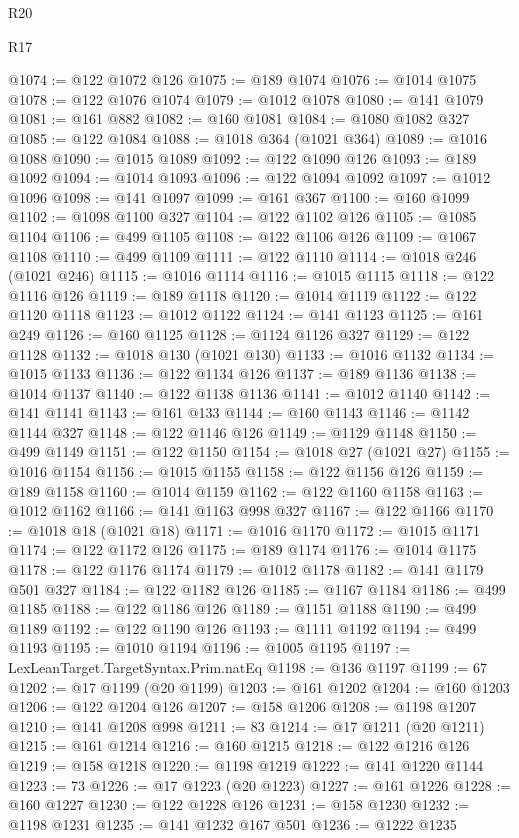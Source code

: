 \begin{lexlean}{R20}
\begin{lexlean}{R17}
\begin{coremodule}
{{{{{{{{{{{{{{{{{{{{{{{{{{{{{{{{{{{{{{{{{{{{{{{{{{{{{{{{{{{{{{{{{{{{{{{{{{{{{{{{{{{{{{{{{{{{{{{{{{{{{{{{{{{@1074 := @122 @1072 @126
@1075 := @189 @1074
@1076 := @1014 @1075
@1078 := @122 @1076 @1074
@1079 := @1012 @1078
@1080 := @141 @1079
@1081 := @161 @882
@1082 := @160 @1081
@1084 := @1080 @1082 @327
@1085 := @122 @1084
@1088 := @1018 @364 (@1021 @364)
@1089 := @1016 @1088
@1090 := @1015 @1089
@1092 := @122 @1090 @126
@1093 := @189 @1092
@1094 := @1014 @1093
@1096 := @122 @1094 @1092
@1097 := @1012 @1096
@1098 := @141 @1097
@1099 := @161 @367
@1100 := @160 @1099
@1102 := @1098 @1100 @327
@1104 := @122 @1102 @126
@1105 := @1085 @1104
@1106 := @499 @1105
@1108 := @122 @1106 @126
@1109 := @1067 @1108
@1110 := @499 @1109
@1111 := @122 @1110
@1114 := @1018 @246 (@1021 @246)
@1115 := @1016 @1114
@1116 := @1015 @1115
@1118 := @122 @1116 @126
@1119 := @189 @1118
@1120 := @1014 @1119
@1122 := @122 @1120 @1118
@1123 := @1012 @1122
@1124 := @141 @1123
@1125 := @161 @249
@1126 := @160 @1125
@1128 := @1124 @1126 @327
@1129 := @122 @1128
@1132 := @1018 @130 (@1021 @130)
@1133 := @1016 @1132
@1134 := @1015 @1133
@1136 := @122 @1134 @126
@1137 := @189 @1136
@1138 := @1014 @1137
@1140 := @122 @1138 @1136
@1141 := @1012 @1140
@1142 := @141 @1141
@1143 := @161 @133
@1144 := @160 @1143
@1146 := @1142 @1144 @327
@1148 := @122 @1146 @126
@1149 := @1129 @1148
@1150 := @499 @1149
@1151 := @122 @1150
@1154 := @1018 @27 (@1021 @27)
@1155 := @1016 @1154
@1156 := @1015 @1155
@1158 := @122 @1156 @126
@1159 := @189 @1158
@1160 := @1014 @1159
@1162 := @122 @1160 @1158
@1163 := @1012 @1162
@1166 := @141 @1163 @998 @327
@1167 := @122 @1166
@1170 := @1018 @18 (@1021 @18)
@1171 := @1016 @1170
@1172 := @1015 @1171
@1174 := @122 @1172 @126
@1175 := @189 @1174
@1176 := @1014 @1175
@1178 := @122 @1176 @1174
@1179 := @1012 @1178
@1182 := @141 @1179 @501 @327
@1184 := @122 @1182 @126
@1185 := @1167 @1184
@1186 := @499 @1185
@1188 := @122 @1186 @126
@1189 := @1151 @1188
@1190 := @499 @1189
@1192 := @122 @1190 @126
@1193 := @1111 @1192
@1194 := @499 @1193
@1195 := @1010 @1194
@1196 := @1005 @1195
@1197 := LexLeanTarget.TargetSyntax.Prim.natEq
@1198 := @136 @1197
@1199 := 67
@1202 := @17 @1199 (@20 @1199)
@1203 := @161 @1202
@1204 := @160 @1203
@1206 := @122 @1204 @126
@1207 := @158 @1206
@1208 := @1198 @1207
@1210 := @141 @1208 @998
@1211 := 83
@1214 := @17 @1211 (@20 @1211)
@1215 := @161 @1214
@1216 := @160 @1215
@1218 := @122 @1216 @126
@1219 := @158 @1218
@1220 := @1198 @1219
@1222 := @141 @1220 @1144
@1223 := 73
@1226 := @17 @1223 (@20 @1223)
@1227 := @161 @1226
@1228 := @160 @1227
@1230 := @122 @1228 @126
@1231 := @158 @1230
@1232 := @1198 @1231
@1235 := @141 @1232 @167 @501
@1236 := @1222 @1235
}}}}}}}}}}}}}}}}}}}}}}}}}}}}}}}}}}}}}}}}}}}}}}}}}}}}}}}}}}}}}}}}}}}}}}}}}}}}}}}}}}}}}}}}}}}}}}}}}}}}}}}}}}}
\end{coremodule}
\end{lexlean}
\end{lexlean}
